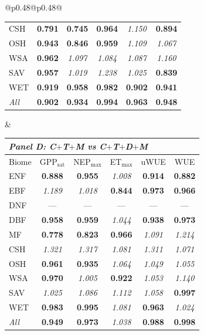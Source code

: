 \begin{table}[htbp]
\begin{tabular}{@{}p{0.48\linewidth}@{\hspace{0.04\linewidth}}p{0.48\linewidth}@{}}
\begin{tabular}{lccccc}
CSH & \textbf{0.791} & \textbf{0.745} & \textbf{0.964} & \textit{1.150} & \textbf{0.894} \\
OSH & \textbf{0.943} & \textbf{0.846} & \textbf{0.959} & \textit{1.109} & \textit{1.067} \\
WSA & \textbf{0.962} & \textit{1.097} & \textit{1.084} & \textit{1.087} & \textit{1.160} \\
SAV & \textbf{0.957} & \textit{1.019} & \textit{1.238} & \textit{1.025} & \textbf{0.839} \\
WET & \textbf{0.919} & \textbf{0.958} & \textbf{0.982} & \textbf{0.902} & \textbf{0.941} \\
\midrule
\textit{All} & \textbf{0.902} & \textbf{0.934} & \textbf{0.994} & \textbf{0.963} & \textbf{0.948} \\
\bottomrule
\end{tabular} &
\footnotesize
\setlength{\tabcolsep}{3.5pt}
\renewcommand{\arraystretch}{1.06}
\begin{tabular}{lccccc}
\toprule
\multicolumn{6}{l}{\textit{Panel D: C$+$T$+$M vs C$+$T$+$D$+$M}} \\
\midrule
Biome & GPP$_\mathrm{sat}$ & NEP$_\mathrm{max}$ & ET$_\mathrm{max}$ & uWUE & WUE \\
\midrule
ENF & \textbf{0.888} & \textbf{0.955} & \textit{1.008} & \textbf{0.914} & \textbf{0.882} \\
EBF & \textit{1.189} & \textit{1.018} & \textbf{0.844} & \textbf{0.973} & \textbf{0.966} \\
DNF & --- & --- & --- & --- & --- \\
DBF & \textbf{0.958} & \textbf{0.959} & \textit{1.044} & \textbf{0.938} & \textbf{0.973} \\
MF & \textbf{0.778} & \textbf{0.823} & \textbf{0.966} & \textit{1.091} & \textit{1.214} \\
CSH & \textit{1.321} & \textit{1.317} & \textit{1.081} & \textit{1.311} & \textit{1.071} \\
OSH & \textbf{0.961} & \textbf{0.935} & \textit{1.064} & \textit{1.049} & \textit{1.055} \\
WSA & \textbf{0.970} & \textit{1.005} & \textbf{0.922} & \textit{1.053} & \textit{1.140} \\
SAV & \textit{1.025} & \textit{1.086} & \textit{1.112} & \textit{1.058} & \textbf{0.997} \\
WET & \textbf{0.983} & \textbf{0.995} & \textit{1.081} & \textbf{0.963} & \textit{1.024} \\
\midrule
\textit{All} & \textbf{0.949} & \textbf{0.973} & \textit{1.038} & \textbf{0.988} & \textbf{0.998} \\
\bottomrule
\end{tabular} \\
\end{tabular}
\end{table}
